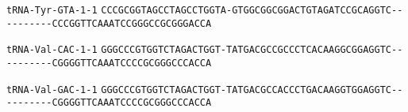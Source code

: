 \documentclass{article}
\newcommand{\rnabox}[1]{\colorbox{#1}{\texttt{#1}}}
\begin{document}
\vspace{-0.5mm}

\texttt{tRNA-Tyr-GTA-1-1}
\rnabox{C}\rnabox{C}\rnabox{C}\rnabox{G}\rnabox{C}\rnabox{G}\rnabox{G}\rnabox{T}\rnabox{A}\rnabox{G}\rnabox{C}\rnabox{C}\rnabox{T}\rnabox{A}\rnabox{G}\rnabox{C}\rnabox{C}\rnabox{T}\rnabox{G}\rnabox{G}\rnabox{T}\rnabox{A}\rnabox{-}\rnabox{G}\rnabox{T}\rnabox{G}\rnabox{G}\rnabox{C}\rnabox{G}\rnabox{G}\rnabox{C}\rnabox{G}\rnabox{G}\rnabox{A}\rnabox{C}\rnabox{T}\rnabox{G}\rnabox{T}\rnabox{A}\rnabox{G}\rnabox{A}\rnabox{T}\rnabox{C}\rnabox{C}\rnabox{G}\rnabox{C}\rnabox{A}\rnabox{G}\rnabox{G}\rnabox{T}\rnabox{C}\rnabox{-}\rnabox{-}\rnabox{-}\rnabox{-}\rnabox{-}\rnabox{-}\rnabox{-}\rnabox{-}\rnabox{-}\rnabox{-}\rnabox{C}\rnabox{C}\rnabox{C}\rnabox{G}\rnabox{G}\rnabox{T}\rnabox{T}\rnabox{C}\rnabox{A}\rnabox{A}\rnabox{A}\rnabox{T}\rnabox{C}\rnabox{C}\rnabox{G}\rnabox{G}\rnabox{G}\rnabox{C}\rnabox{C}\rnabox{G}\rnabox{C}\rnabox{G}\rnabox{G}\rnabox{G}\rnabox{A}\rnabox{C}\rnabox{C}\rnabox{A}

\vspace{-0.5mm}

\texttt{tRNA-Val-CAC-1-1}
\rnabox{G}\rnabox{G}\rnabox{G}\rnabox{C}\rnabox{C}\rnabox{C}\rnabox{G}\rnabox{T}\rnabox{G}\rnabox{G}\rnabox{T}\rnabox{C}\rnabox{T}\rnabox{A}\rnabox{G}\rnabox{A}\rnabox{C}\rnabox{T}\rnabox{G}\rnabox{G}\rnabox{T}\rnabox{-}\rnabox{T}\rnabox{A}\rnabox{T}\rnabox{G}\rnabox{A}\rnabox{C}\rnabox{G}\rnabox{C}\rnabox{C}\rnabox{G}\rnabox{C}\rnabox{C}\rnabox{C}\rnabox{T}\rnabox{C}\rnabox{A}\rnabox{C}\rnabox{A}\rnabox{A}\rnabox{G}\rnabox{G}\rnabox{C}\rnabox{G}\rnabox{G}\rnabox{A}\rnabox{G}\rnabox{G}\rnabox{T}\rnabox{C}\rnabox{-}\rnabox{-}\rnabox{-}\rnabox{-}\rnabox{-}\rnabox{-}\rnabox{-}\rnabox{-}\rnabox{-}\rnabox{-}\rnabox{C}\rnabox{G}\rnabox{G}\rnabox{G}\rnabox{G}\rnabox{T}\rnabox{T}\rnabox{C}\rnabox{A}\rnabox{A}\rnabox{A}\rnabox{T}\rnabox{C}\rnabox{C}\rnabox{C}\rnabox{C}\rnabox{G}\rnabox{C}\rnabox{G}\rnabox{G}\rnabox{G}\rnabox{C}\rnabox{C}\rnabox{C}\rnabox{A}\rnabox{C}\rnabox{C}\rnabox{A}

\vspace{-0.5mm}

\texttt{tRNA-Val-GAC-1-1}
\rnabox{G}\rnabox{G}\rnabox{G}\rnabox{C}\rnabox{C}\rnabox{C}\rnabox{G}\rnabox{T}\rnabox{G}\rnabox{G}\rnabox{T}\rnabox{C}\rnabox{T}\rnabox{A}\rnabox{G}\rnabox{A}\rnabox{C}\rnabox{T}\rnabox{G}\rnabox{G}\rnabox{T}\rnabox{-}\rnabox{T}\rnabox{A}\rnabox{T}\rnabox{G}\rnabox{A}\rnabox{C}\rnabox{G}\rnabox{C}\rnabox{C}\rnabox{A}\rnabox{C}\rnabox{C}\rnabox{C}\rnabox{T}\rnabox{G}\rnabox{A}\rnabox{C}\rnabox{A}\rnabox{A}\rnabox{G}\rnabox{G}\rnabox{T}\rnabox{G}\rnabox{G}\rnabox{A}\rnabox{G}\rnabox{G}\rnabox{T}\rnabox{C}\rnabox{-}\rnabox{-}\rnabox{-}\rnabox{-}\rnabox{-}\rnabox{-}\rnabox{-}\rnabox{-}\rnabox{-}\rnabox{-}\rnabox{C}\rnabox{G}\rnabox{G}\rnabox{G}\rnabox{G}\rnabox{T}\rnabox{T}\rnabox{C}\rnabox{A}\rnabox{A}\rnabox{A}\rnabox{T}\rnabox{C}\rnabox{C}\rnabox{C}\rnabox{C}\rnabox{G}\rnabox{C}\rnabox{G}\rnabox{G}\rnabox{G}\rnabox{C}\rnabox{C}\rnabox{C}\rnabox{A}\rnabox{C}\rnabox{C}\rnabox{A}
\end{document}
